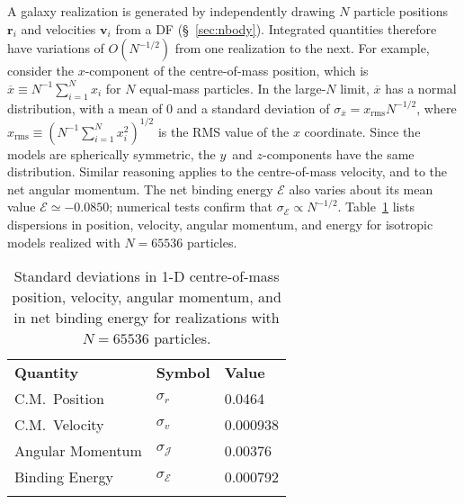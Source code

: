 \documentclass[fleqn,usenatbib]{mnras}
\begin{document}
A galaxy realization is generated by independently drawing $N$ particle positions $\mathbf{r}_i$ and velocities $\mathbf{v}_i$ from a DF (\S~\ref{sec:nbody}). Integrated quantities therefore have variations of $O(N^{-1/2})$ from one realization to the next. For example, consider the $x$-component of the centre-of-mass position, which is $\overline{x} \equiv N^{-1} \sum_{i=1}^{N} x_i$ for $N$ equal-mass particles. In the large-$N$ limit, $\overline{x}$ has a normal distribution, with a mean of $0$ and a standard deviation of $\sigma_{\overline{x}} = x_\mathrm{rms} N^{-1/2}$, where $x_\mathrm{rms} \equiv (N^{-1} \sum_{i=1}^{N} x_i^2)^{1/2}$ is the RMS value of the $x$ coordinate. Since the models are spherically symmetric, the $y$~and $z$-components have the same distribution. Similar reasoning applies to the centre-of-mass velocity, and to the net angular momentum. The net binding energy $\mathcal{E}$ also varies about its mean value $\mathcal{E} \simeq -0.0850$; numerical tests confirm that $\sigma_\mathcal{E} \propto N^{-1/2}$. Table~\ref{tab:model_variation} lists dispersions in position, velocity, angular momentum, and energy for isotropic models realized with $N = 65536$ particles.

\begin{table}
    \centering
    \caption{Standard deviations in 1-D centre-of-mass position, velocity, angular momentum, and in net binding energy for realizations with $N = 65536$ particles.}
    \begin{tabular}{lll}
    \noalign{\bigskip} \hline \noalign{\smallskip}
    \textbf{Quantity} & \textbf{Symbol} & \textbf{Value} \\
    \noalign{\smallskip} \hline \noalign{\smallskip}
    C.M.~Position    & $\sigma_{r}$ & 0.0464 \\
    C.M.~Velocity    & $\sigma_{v}$ & 0.000938 \\
    Angular Momentum & $\sigma_\mathcal{J}$ & 0.00376 \\
    Binding Energy   & $\sigma_\mathcal{E}$ & 0.000792 \\
    \noalign{\smallskip} \hline
    \end{tabular}
    \label{tab:model_variation}
\end{table}
\end{document}
